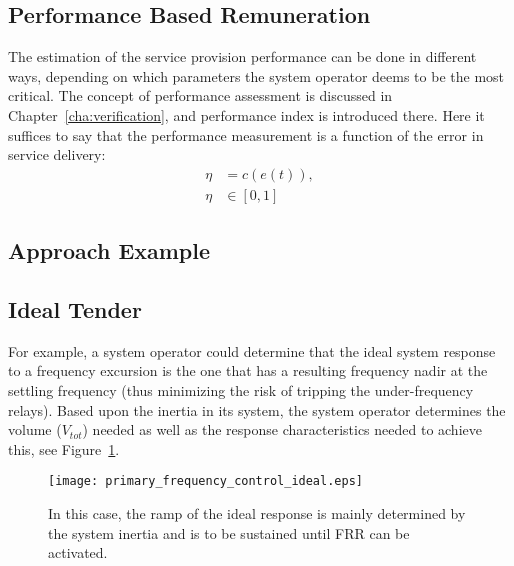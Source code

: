 
\subsection*{Performance Based Remuneration} %
\label{sub:PerformanceBasedRemuneration}

The estimation of the service provision performance can be done in different ways, depending on which parameters the system operator deems to be the most critical. The concept of performance assessment is discussed in Chapter~\ref{cha:verification}, and performance index is introduced there. Here it suffices to say that the performance measurement is a function of the error in service delivery:
\begin{align}
	\eta &= c(e(t)), \label{eq:perfindexsimple}\\
	\eta &\in [0,1]
\end{align}

\subsection{Approach Example} %
\label{sub:ApproachExample}
\subsection*{Ideal Tender}
For example, a system operator could determine that the ideal system response to a frequency excursion is the one that has a resulting frequency nadir at the settling frequency (thus minimizing the risk of tripping the under-frequency relays). Based upon the inertia in its system, the system operator determines the volume ($V_{tot}$) needed as well as the response characteristics needed to achieve this, see Figure~\ref{fig:idealresponse}.

\begin{figure}[htbp!]
\centering
\texttt{[image: primary\_frequency\_control\_ideal.eps]}
\caption{In this case, the ramp of the ideal response is mainly determined by the system inertia and is to be sustained until FRR can be activated.}
\label{fig:idealresponse}
\end{figure}

